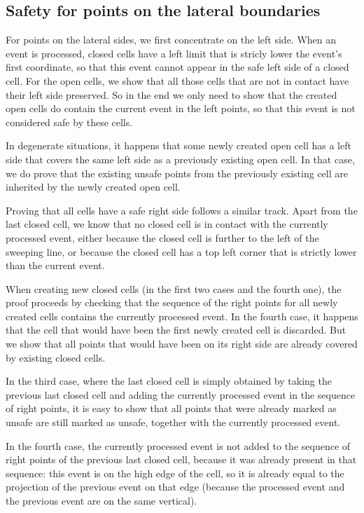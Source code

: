 \documentclass[a4paper, USenglish, cleveref, autoref, thm-restate]{lipics-v2021}
\begin{document}
\subsection{Safety for points on the lateral boundaries}
For points on the lateral sides, we first concentrate on the left side.
When an event is processed, closed cells have a left limit that is
stricly lower the event's first coordinate, so that this event cannot appear
in the safe left side of a closed cell.  For the open cells, we show
that all those cells that are not in contact have their left side preserved.
So in the end we only need to show that the created open cells do contain
the current event in the left points, so that this event is not considered
safe by these cells.

In degenerate situations, it happens that some newly created
open cell has a left side that covers the same left side as a previously
existing open cell.  In that case, we do prove that the existing unsafe points
from the previously existing cell are inherited by the newly
created open cell.

Proving that all cells have a safe right side follows a similar track.
Apart from the last closed cell, we know that no closed cell is in contact
with the currently processed event, either because the closed cell is
further to the left of the sweeping line, or because the closed cell has
a top left corner that is strictly lower than the current event.

When creating new closed cells (in the first two cases and the fourth one),
the proof proceeds by checking that the sequence of the right points
for all newly created cells contains the currently processed event.
In the fourth case, it happens that the cell that would have been
the first newly created cell is discarded.  But we show that all points
that would have been on its right side are already covered by existing closed
cells.

In the third case, where the last closed cell is simply obtained by
taking the previous last closed cell and adding the currently processed event
in the sequence of right points, it is easy to show that all points
that were already marked as unsafe are still marked as unsafe, together with
the currently processed event.

In the fourth case, the currently processed event is not added to the
sequence of right points of the previous last closed cell, because it
was already present in that sequence: this event is on the high edge of
the cell, so it is already equal to the projection of the previous event
on that edge (because the processed event and the previous event are on
the same vertical).
\end{document}
